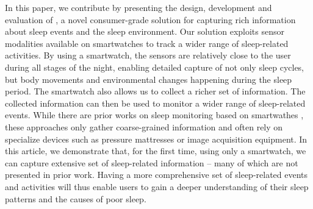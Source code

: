 

In this paper, we contribute by presenting the design, development and evaluation of \systemname, a novel consumer-grade solution for capturing rich information
about sleep events and the sleep environment. Our solution exploits sensor modalities available on smartwatches to track a wider range of sleep-related activities. By using a smartwatch,
the sensors are relatively close to the user during all stages of the night, enabling detailed capture of not only sleep cycles, but body movements and environmental changes happening during the sleep period.
The smartwatch also allows us to collect a richer set of information. The collected information can then be used to monitor a wider range of sleep-related events. While there are prior works on sleep monitoring
based on smartwathes \cite{pombo2016ubisleep,shelgikar2016sleep,haescher2015anomaly,borazio2012combining}, these approaches only gather
coarse-grained information and often rely on specialize devices such as pressure mattresses or image acquisition equipment. In this
article, we demonstrate that, for the first time, using only a smartwatch, we can capture extensive set of sleep-related information -- many of
which are not presented in prior work. Having a more comprehensive set of sleep-related events and activities will thus enable users to
gain a deeper understanding of their sleep patterns and the causes of poor sleep.


